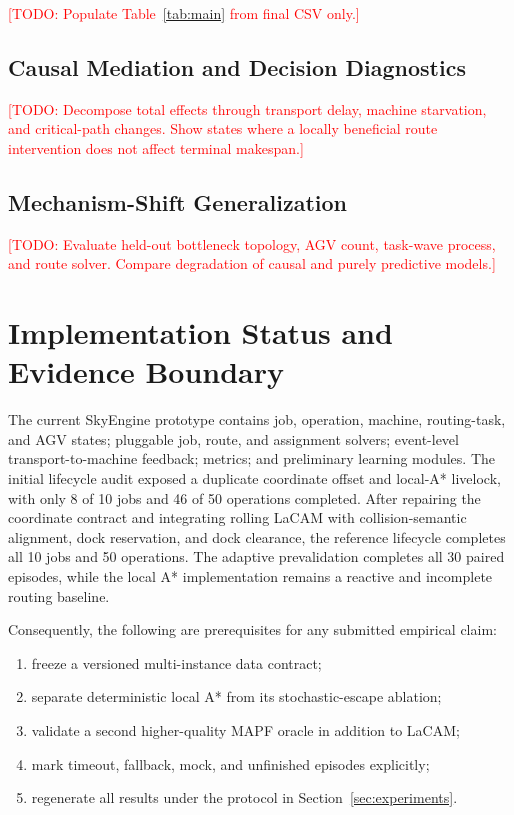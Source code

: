 \documentclass[11pt,a4paper]{article}
\newcommand{\todo}[1]{\textcolor{red}{[TODO: #1]}}
\begin{document}
\todo{Populate Table~\ref{tab:main} from final CSV only.}

\subsection{Causal Mediation and Decision Diagnostics}

\todo{Decompose total effects through transport delay, machine starvation, and
critical-path changes. Show states where a locally beneficial route intervention
does not affect terminal makespan.}

\subsection{Mechanism-Shift Generalization}

\todo{Evaluate held-out bottleneck topology, AGV count, task-wave process, and
route solver. Compare degradation of causal and purely predictive models.}

\section{Implementation Status and Evidence Boundary}
\label{sec:status}

The current SkyEngine prototype contains job, operation, machine, routing-task,
and AGV states; pluggable job, route, and assignment solvers; event-level
transport-to-machine feedback; metrics; and preliminary learning modules. The
initial lifecycle audit exposed a duplicate coordinate offset and local-A*
livelock, with only 8 of 10 jobs and 46 of 50 operations completed. After
repairing the coordinate contract and integrating rolling LaCAM with
collision-semantic alignment, dock reservation, and dock clearance, the
reference lifecycle completes all 10 jobs and 50 operations. The adaptive
prevalidation completes all 30 paired episodes, while the local A*
implementation remains a reactive and incomplete routing baseline.

Consequently, the following are prerequisites for any submitted empirical
claim:

\begin{enumerate}[leftmargin=*]
    \item freeze a versioned multi-instance data contract;
    \item separate deterministic local A* from its stochastic-escape ablation;
    \item validate a second higher-quality MAPF oracle in addition to LaCAM;
    \item mark timeout, fallback, mock, and unfinished episodes explicitly;
    \item regenerate all results under the protocol in
    Section~\ref{sec:experiments}.
\end{enumerate}
\end{document}
